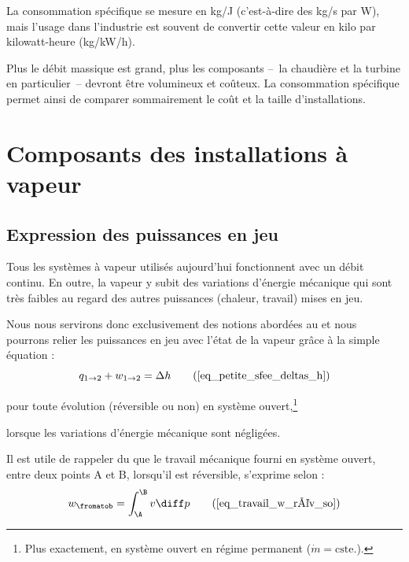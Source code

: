 		La consommation spécifique se mesure en \si[per-mode = symbol]{\kilogram\per\joule} (c’est-à-dire des \si[per-mode = symbol]{\kilogram\per\second} par \si{\watt}), mais l’usage dans l’industrie est souvent de convertir cette valeur en kilo par kilowatt-heure (\si[per-mode = symbol]{\kilogram\per\kilo\watt\per\hour}).

		Plus le débit massique est grand, plus les composants --\ la chaudière et la turbine en particulier\ --   devront être volumineux et coûteux. La consommation spécifique permet ainsi de comparer sommairement le coût et la taille d’installations.



\section{Composants des installations à vapeur}



	\subsection{Expression des puissances en jeu}
	\label{ch_expressions_puissances_vapeur}

		Tous les systèmes à vapeur utilisés aujourd’hui fonctionnent avec un débit continu. En outre, la vapeur y subit des variations d’énergie mécanique qui sont très faibles au regard des autres puissances (chaleur, travail) mises en jeu.

		Nous nous servirons donc exclusivement des notions abordées au \courstrois et nous pourrons relier les puissances en jeu avec l’état de la vapeur grâce à la simple équation :
		\begin{equation}
				q_{1 \to 2} + w_{1 \to 2} = \Delta h 	\tag{\ref{eq_petite_sfee_deltas_h}}
		\end{equation}

		\begin{equationterms}
			\item pour toute évolution (réversible ou non) en système ouvert,\footnote{Plus exactement, en système ouvert en régime permanent ($\dot m = \text{cste.}$).}
			\item lorsque les variations d’énergie mécanique sont négligées.
		\end{equationterms}

		Il est utile de rappeler du \courstrois que le travail mécanique fourni en système ouvert, entre deux points A et B, lorsqu’il est réversible, s’exprime selon :
		\begin{equation}
				w_\fromatob =  \int_\A^\B v  \diff p  		\tag{\ref{eq_travail_w_rév_so}}
		\end{equation}

